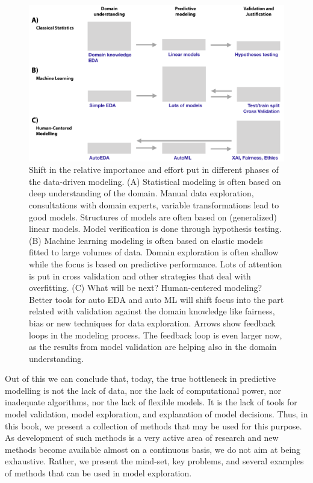 \documentclass[12pt,]{krantz}
\begin{document}
\begin{figure}

{\centering \includegraphics[width=0.9\linewidth]{figure/UMEPImportance} 

}

\caption{Shift in the relative importance and effort put in different phases of the data-driven modeling. (A) Statistical modeling is often based on deep understanding of the domain. Manual data exploration, consultations with domain experts, variable transformations lead to good models. Structures of models are often based on (generalized) linear models. Model verification is done through hypothesis testing. (B) Machine learning modeling is often based on elastic models fitted to large volumes of data. Domain exploration is often shallow while the focus is based on predictive performance. Lots of attention is put in cross validation and other strategies that deal with overfitting. (C) What will be next? Human-centered modeling? Better tools for auto EDA and auto ML will shift focus into the part related with validation against the domain knowledge like fairness, bias or new techniques for data exploration. Arrows show feedback loops in the modeling process. The feedback loop is even larger now, as the results from model validation are helping also in the domain understanding.}\label{fig:UMEPImportance}
\end{figure}

Out of this we can conclude that, today, the true bottleneck in predictive modelling is not the lack of data, nor the lack of computational power, nor inadequate algorithms, nor the lack of flexible models. It is the lack of tools for model validation, model exploration, and explanation of model decisions. Thus, in this book, we present a collection of methods that may be used for this purpose. As development of such methods is a very active area of research and new methods become available almost on a continuous basis, we do not aim at being exhaustive. Rather, we present the mind-set, key problems, and several examples of methods that can be used in model exploration.
\end{document}
